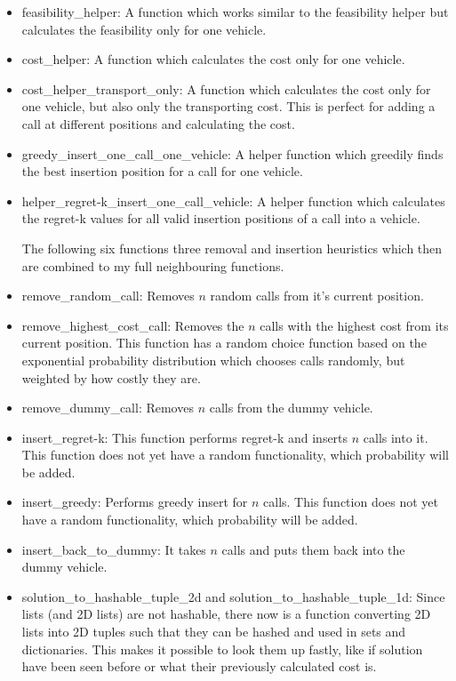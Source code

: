 \documentclass[a4paper,11pt]{article}
\theoremstyle{mytheor}
\begin{document}
\begin{itemize}
\item feasibility\_helper: A function which works similar to the feasibility helper but calculates the feasibility only for one vehicle.
\item cost\_helper: A function which calculates the cost only for one vehicle.
\item cost\_helper\_transport\_only: A function which calculates the cost only for one vehicle, but also only the transporting cost. This is perfect for adding a call at different positions and calculating the cost.
\item greedy\_insert\_one\_call\_one\_vehicle: A helper function which greedily finds the best insertion position for a call for one vehicle.
\item helper\_regret-k\_insert\_one\_call\_vehicle: A helper function which calculates the regret-k values for all valid insertion positions of a call into a vehicle.

The following six functions three removal and insertion heuristics which then are combined to my full neighbouring functions.
\item remove\_random\_call: Removes $n$ random calls from it's current position.
\item remove\_highest\_cost\_call: Removes the $n$ calls with the highest cost from its current position. This function has a random choice function based on the exponential probability distribution which chooses calls randomly, but weighted by how costly they are.
\item remove\_dummy\_call: Removes $n$ calls from the dummy vehicle.
\item insert\_regret-k: This function performs regret-k and inserts $n$ calls into it. This function does not yet have a random functionality, which probability will be added.
\item insert\_greedy: Performs greedy insert for $n$ calls. This function does not yet have a random functionality, which probability will be added.
\item insert\_back\_to\_dummy: It takes $n$ calls and puts them back into the dummy vehicle.
\item solution\_to\_hashable\_tuple\_2d and solution\_to\_hashable\_tuple\_1d: Since lists (and 2D lists) are not hashable, there now is a function converting 2D lists into 2D tuples such that they can be hashed and used in sets and dictionaries. This makes it possible to look them up fastly, like if solution have been seen before or what their previously calculated cost is.
\end{itemize}\medskip
\end{document}
